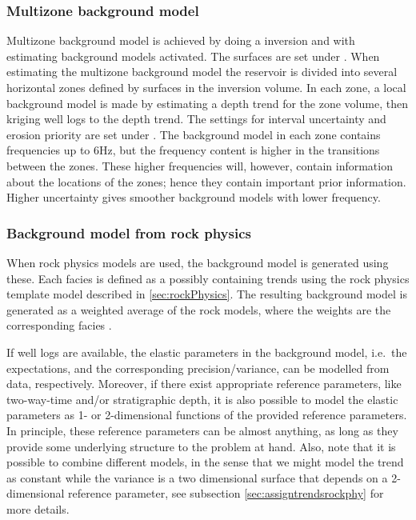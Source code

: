 \subsubsection{Multizone background model}
Multizone background model is achieved by doing a  inversion and with estimating background models activated. The surfaces are set under . When estimating the multizone background model the reservoir is divided into several horizontal zones defined by surfaces in the inversion volume. In each zone, a local background model is made by estimating a depth trend for the zone volume, then kriging well logs to the depth trend. The settings for interval uncertainty and erosion priority are set under . The background model in each zone contains frequencies up to 6Hz, but the frequency content is higher in the transitions between the zones. These higher frequencies will, however, contain information about the locations of the zones; hence they contain important prior information. Higher uncertainty gives smoother background models with lower frequency.

\subsubsection{Background model from rock physics}
When rock physics models are used, the background model is generated using these. Each facies is defined as a  possibly containing trends using the rock physics template model described in \autoref{sec:rockPhysics}. The resulting background model is generated as a weighted average of the rock models, where the weights are the corresponding facies . 

If well logs are available, the elastic parameters in the background model, 
i.e.~the expectations, and the corresponding precision/variance, can be 
modelled from data, respectively. Moreover, if there exist appropriate 
reference parameters, like two-way-time and/or stratigraphic depth,
 it is also possible to model the elastic parameters as 1- or 2-dimensional 
functions of the provided reference parameters. 
In principle, these reference parameters can be almost anything, as long as they
provide some underlying structure to the problem at hand.
Also, note that it is possible to combine different models, in the sense that we might 
model the trend as constant while the variance is a two dimensional surface that 
depends on a 2-dimensional reference parameter, see subsection
\ref{sec:assigntrendsrockphy} for more details.

